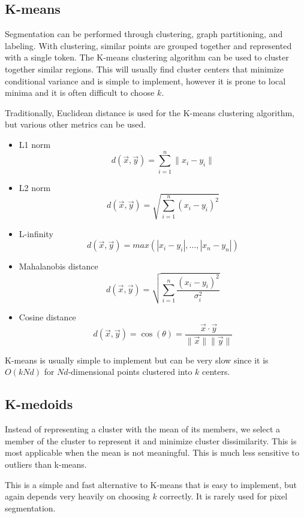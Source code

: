 \documentclass{math}
\begin{document}
\subsection*{K-means}
Segmentation can be performed through clustering, graph partitioning, and
labeling. With clustering, similar points are grouped together and represented
with a single token. The K-means clustering algorithm can be used to cluster
together similar regions. This will usually find cluster centers that
minimize conditional variance and is simple to implement, however it is prone
to local minima and it is often difficult to choose \( k \). \par
Traditionally, Euclidean distance is used for the K-means clustering algorithm,
but various other metrics can be used.
\begin{itemize}
  \item L1 norm
  \[ d(\vec{x},\vec{y}) = \sum_{i=1}^{n}\|x_i-y_i\| \]
  \item L2 norm
  \[ d(\vec{x},\vec{y}) = \sqrt{\sum_{i=1}^{n}(x_i-y_i)^2} \]
  \item L-infinity
  \[ d(\vec{x},\vec{y}) = max(|x_i-y_i|,\dots,|x_n-y_n|) \]
  \item Mahalanobis distance
  \[ d(\vec{x},\vec{y}) = \sqrt{\sum_{i=1}^{n}\frac{(x_i-y_i)^2}{\sigma_i^2}} \]
  \item Cosine distance
  \[ d(\vec{x},\vec{y}) = \cos(\theta) =
    \frac{\vec{x}\cdot\vec{y}}{\|\vec{x}\|\|\vec{y}\|} \]
\end{itemize}
K-means is usually simple to implement but can be very slow since it is
\( O(kNd) \) for \( N d \)-dimensional points clustered into \( k \) centers.

\subsection*{K-medoids}
Instead of representing a cluster with the mean of its members, we select a
member of the cluster to represent it and minimize cluster dissimilarity. This
is most applicable when the mean is not meaningful. This is much less sensitive
to outliers than k-means. \par
This is a simple and fast alternative to K-means that is easy to implement, but
again depends very heavily on choosing \( k \) correctly. It is rarely used
for pixel segmentation.
\end{document}

